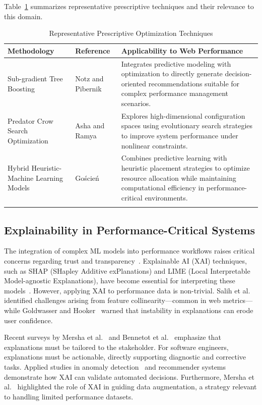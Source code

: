 \documentclass[sn-nature]{sn-jnl}
\begin{document}
Table~\ref{tab:prescriptive_methods} summarizes representative prescriptive techniques and their relevance to this domain.

\begin{table}[h]
\caption{Representative Prescriptive Optimization Techniques}\label{tab:prescriptive_methods}
\centering
\begin{tabular}{p{} p{} p{}}
\toprule
Methodology & Reference & Applicability to Web Performance \\
\midrule
Sub-gradient Tree Boosting &
Notz and Pibernik~\cite{notz2024} &
Integrates predictive modeling with optimization to directly generate decision-oriented recommendations suitable for complex performance management scenarios. \\

Predator Crow Search Optimization &
Asha and Ramya~\cite{asha2025} &
Explores high-dimensional configuration spaces using evolutionary search strategies to improve system performance under nonlinear constraints. \\

Hybrid Heuristic-Machine Learning Models &
Go\'{s}cie\'{n}~\cite{goscien2025} &
Combines predictive learning with heuristic placement strategies to optimize resource allocation while maintaining computational efficiency in performance-critical environments. \\
\botrule
\end{tabular}
\end{table}

\subsection{Explainability in Performance-Critical Systems}

The integration of complex ML models into performance workflows raises critical concerns regarding trust and transparency~\cite{ali2023, goyal2025}. Explainable AI (XAI) techniques, such as SHAP (SHapley Additive exPlanations) and LIME (Local Interpretable Model-agnostic Explanations), have become essential for interpreting these models~\cite{hassija2024, ortigossa2024}. However, applying XAI to performance data is non-trivial. Salih et al.~\cite{salih2024} identified challenges arising from feature collinearity—common in web metrics—while Goldwasser and Hooker~\cite{goldwasser2024} warned that instability in explanations can erode user confidence.

Recent surveys by Mersha et al.~\cite{mersha2024} and Bennetot et al.~\cite{bennetot2024} emphasize that explanations must be tailored to the stakeholder. For software engineers, explanations must be actionable, directly supporting diagnostic and corrective tasks. Applied studies in anomaly detection~\cite{alam2024} and recommender systems~\cite{rahim2025, benleulmi2025} demonstrate how XAI can validate automated decisions. Furthermore, Mersha et al.~\cite{mersha2025} highlighted the role of XAI in guiding data augmentation, a strategy relevant to handling limited performance datasets.
\end{document}
